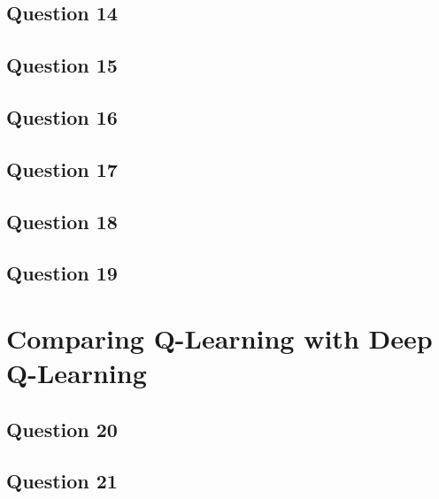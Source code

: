 \documentclass[10pt]{IEEEtran}
\begin{document}
\subsection*{Question 14}
\subsection*{Question 15}
\subsection*{Question 16}
\subsection*{Question 17}
\subsection*{Question 18}
\subsection*{Question 19}

\section{Comparing Q-Learning with Deep Q-Learning}
\subsection*{Question 20}
\subsection*{Question 21}

\nocite{*}
\printbibliography

\clearpage
{}
\end{document}
